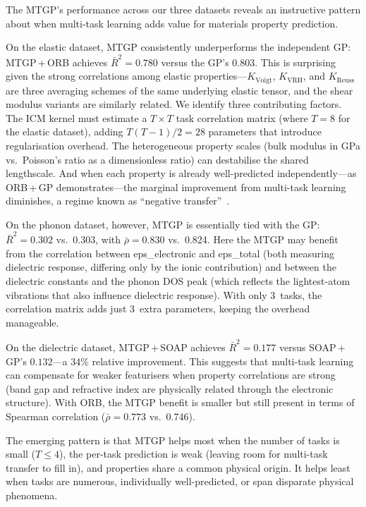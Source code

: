 The MTGP's performance across our three datasets reveals an instructive pattern about when multi-task learning adds value for materials property prediction.

On the elastic dataset, MTGP consistently underperforms the independent GP: MTGP\,+\,ORB achieves $\bar{R}^2 = 0.780$ versus the GP's 0.803.
This is surprising given the strong correlations among elastic properties---$K_{\text{Voigt}}$, $K_{\text{VRH}}$, and $K_{\text{Reuss}}$ are three averaging schemes of the same underlying elastic tensor, and the shear modulus variants are similarly related.
We identify three contributing factors.
The ICM kernel must estimate a $T \times T$ task correlation matrix (where $T = 8$ for the elastic dataset), adding $T(T-1)/2 = 28$ parameters that introduce regularisation overhead.
The heterogeneous property scales (bulk modulus in GPa vs.\ Poisson's ratio as a dimensionless ratio) can destabilise the shared lengthscale.
And when each property is already well-predicted independently---as ORB\,+\,GP demonstrates---the marginal improvement from multi-task learning diminishes, a regime known as ``negative transfer''~\cite{yamada2019predicting}.

On the phonon dataset, however, MTGP is essentially tied with the GP: $\bar{R}^2 = 0.302$ vs.\ 0.303, with $\bar{\rho} = 0.830$ vs.\ 0.824.
Here the MTGP may benefit from the correlation between eps\_electronic and eps\_total (both measuring dielectric response, differing only by the ionic contribution) and between the dielectric constants and the phonon DOS peak (which reflects the lightest-atom vibrations that also influence dielectric response).
With only 3~tasks, the correlation matrix adds just 3~extra parameters, keeping the overhead manageable.

On the dielectric dataset, MTGP\,+\,SOAP achieves $\bar{R}^2 = 0.177$ versus SOAP\,+\,GP's $0.132$---a 34\% relative improvement.
This suggests that multi-task learning can compensate for weaker featurisers when property correlations are strong (band gap and refractive index are physically related through the electronic structure).
With ORB, the MTGP benefit is smaller but still present in terms of Spearman correlation ($\bar{\rho} = 0.773$ vs.\ 0.746).

The emerging pattern is that MTGP helps most when the number of tasks is small ($T \leq 4$), the per-task prediction is weak (leaving room for multi-task transfer to fill in), and properties share a common physical origin.
It helps least when tasks are numerous, individually well-predicted, or span disparate physical phenomena.

